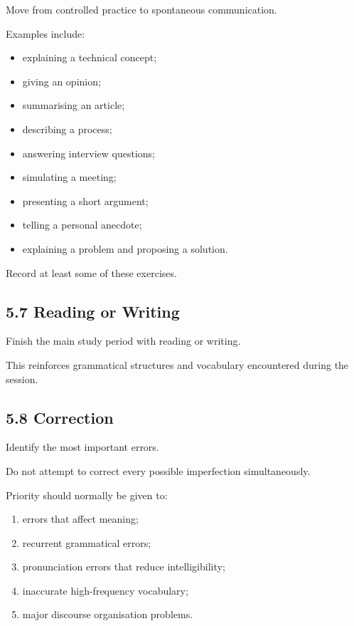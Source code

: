 Move from controlled practice to spontaneous communication.

Examples include:

\begin{itemize}
    \item explaining a technical concept;
    \item giving an opinion;
    \item summarising an article;
    \item describing a process;
    \item answering interview questions;
    \item simulating a meeting;
    \item presenting a short argument;
    \item telling a personal anecdote;
    \item explaining a problem and proposing a solution.
\end{itemize}

Record at least some of these exercises.

\subsection*{5.7 Reading or Writing}

Finish the main study period with reading or writing.

This reinforces grammatical structures and vocabulary encountered during the session.

\subsection*{5.8 Correction}

Identify the most important errors.

Do not attempt to correct every possible imperfection simultaneously.

Priority should normally be given to:

\begin{enumerate}
    \item errors that affect meaning;
    \item recurrent grammatical errors;
    \item pronunciation errors that reduce intelligibility;
    \item inaccurate high-frequency vocabulary;
    \item major discourse organisation problems.
\end{enumerate}

